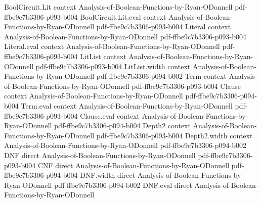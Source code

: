 \begin{theorem}
\leanok
{}
\proofstep
  {BoolCircuit.Lit}
  {context}
  {Analysis-of-Boolean-Functions-by-Ryan-ODonnell}
  {pdf-ffbe9c7b3306-p093-b004}
\proofstep
  {BoolCircuit.Lit.eval}
  {context}
  {Analysis-of-Boolean-Functions-by-Ryan-ODonnell}
  {pdf-ffbe9c7b3306-p093-b004}
\proofstep
  {Literal}
  {context}
  {Analysis-of-Boolean-Functions-by-Ryan-ODonnell}
  {pdf-ffbe9c7b3306-p093-b004}
\proofstep
  {Literal.eval}
  {context}
  {Analysis-of-Boolean-Functions-by-Ryan-ODonnell}
  {pdf-ffbe9c7b3306-p093-b004}
\proofstep
  {LitList}
  {context}
  {Analysis-of-Boolean-Functions-by-Ryan-ODonnell}
  {pdf-ffbe9c7b3306-p093-b004}
\proofstep
  {LitList.width}
  {context}
  {Analysis-of-Boolean-Functions-by-Ryan-ODonnell}
  {pdf-ffbe9c7b3306-p094-b002}
\proofstep
  {Term}
  {context}
  {Analysis-of-Boolean-Functions-by-Ryan-ODonnell}
  {pdf-ffbe9c7b3306-p093-b004}
\proofstep
  {Clause}
  {context}
  {Analysis-of-Boolean-Functions-by-Ryan-ODonnell}
  {pdf-ffbe9c7b3306-p094-b004}
\proofstep
  {Term.eval}
  {context}
  {Analysis-of-Boolean-Functions-by-Ryan-ODonnell}
  {pdf-ffbe9c7b3306-p093-b004}
\proofstep
  {Clause.eval}
  {context}
  {Analysis-of-Boolean-Functions-by-Ryan-ODonnell}
  {pdf-ffbe9c7b3306-p094-b004}
\proofstep
  {Depth2}
  {context}
  {Analysis-of-Boolean-Functions-by-Ryan-ODonnell}
  {pdf-ffbe9c7b3306-p093-b004}
\proofstep
  {Depth2.width}
  {context}
  {Analysis-of-Boolean-Functions-by-Ryan-ODonnell}
  {pdf-ffbe9c7b3306-p094-b002}
\proofstep
  {DNF}
  {direct}
  {Analysis-of-Boolean-Functions-by-Ryan-ODonnell}
  {pdf-ffbe9c7b3306-p093-b004}
\proofstep
  {CNF}
  {direct}
  {Analysis-of-Boolean-Functions-by-Ryan-ODonnell}
  {pdf-ffbe9c7b3306-p094-b004}
\proofstep
  {DNF.width}
  {direct}
  {Analysis-of-Boolean-Functions-by-Ryan-ODonnell}
  {pdf-ffbe9c7b3306-p094-b002}
\proofstep
  {DNF.eval}
  {direct}
  {Analysis-of-Boolean-Functions-by-Ryan-ODonnell}

\end{theorem}
